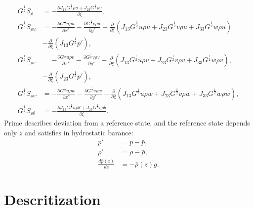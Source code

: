 \begin{align}
  G^{\frac{1}{2}}S_\rho &=      
  - \frac{\partial J_{13}G^{\frac{1}{2}}\rho u + J_{23}G^{\frac{1}{2}}\rho v}{\partial \xi}, \\
  G^{\frac{1}{2}}S_{\rho u}
  &= - \frac{\partial G^{\frac{1}{2}}u\rho u}{\partial x^*}
     - \frac{\partial G^{\frac{1}{2}}v\rho u}{\partial y^*}
     - \frac{\partial}{\partial \xi}(J_{13}G^{\frac{1}{2}}u\rho u + J_{23}G^{\frac{1}{2}}v\rho u + J_{33}G^{\frac{1}{2}}w\rho u) \nonumber\\&
     - \frac{\partial}{\partial \xi}(J_{13}G^{\frac{1}{2}}p'), \\
  G^{\frac{1}{2}}S_{\rho v}
  &= - \frac{\partial G^{\frac{1}{2}}u\rho v}{\partial x^*}
     - \frac{\partial G^{\frac{1}{2}}v\rho v}{\partial y^*}
     - \frac{\partial}{\partial \xi}(J_{13}G^{\frac{1}{2}}u\rho v + J_{23}G^{\frac{1}{2}}v\rho v + J_{33}G^{\frac{1}{2}}w\rho v), \nonumber\\&
     - \frac{\partial}{\partial \xi}(J_{23}G^{\frac{1}{2}}p'), \\
  G^{\frac{1}{2}}S_{\rho w}
  &= - \frac{\partial G^{\frac{1}{2}}u\rho w}{\partial x^*}
     - \frac{\partial G^{\frac{1}{2}}v\rho w}{\partial y^*}
     - \frac{\partial}{\partial \xi}(J_{13}G^{\frac{1}{2}}u\rho w + J_{23}G^{\frac{1}{2}}v\rho w + J_{33}G^{\frac{1}{2}}w\rho w), \\
  G^{\frac{1}{2}}S_{\rho\theta} &= 
  - \frac{\partial J_{13}G^{\frac{1}{2}}u\rho\theta+J_{23}G^{\frac{1}{2}}v\rho\theta}{\partial \xi}.
\end{align}
Prime describes deviation from a reference state, and the reference state depends only $z$ and satisfies in hydrostatic barance:
\begin{align}
  p' &= p - \bar{p}, \\
  \rho' &= \rho - \bar{\rho}, \\
  \frac{d \bar{p}(z)}{d z} &= -\bar{\rho}(z) g.
\end{align}

\section{Descritization}

